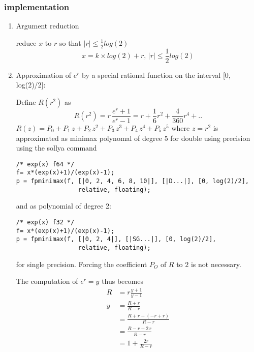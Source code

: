 \documentclass[12pt]{article}
\numberwithin{equation}{subsection}
\begin{document}
\subsubsection{implementation}
\begin{enumerate}
\item Argument reduction

      reduce $x$ to $r$ so that $ |r| \le \frac{1}{2} log(2) $
      \begin{equation}
        x = k \times log(2) + r, \, |r| \le \frac{1}{2} log(2)
      \end{equation}

\item Approximation of $e^r$ by a special rational function on the interval
    [0,\,log(2)/2]:

    Define $ R(r^2) $ as
    \begin{equation}
        R(r^2) = r \, \frac{e^r+1}{e^r-1}
               = r + \frac{1}{6}r^2 + \frac{4}{360}r^4 + ..
    \end{equation}
    $ R(z) = P_0 + P_1\, z + P_2\,z^2 + P_3\,z^3 + P_4\,z^4+ P_5\, z^5$
    where $z = r^2$ is approximated as minimax polynomal of degree 5 for double
    using precision using the sollya command

    \begin{verbatim}
/* exp(x) f64 */
f= x*(exp(x)+1)/(exp(x)-1);
p = fpminimax(f, [|0, 2, 4, 6, 8, 10|], [|D...|], [0, log(2)/2],
                 relative, floating);
    \end{verbatim}
    and as polynomial of degree 2:
    \begin{verbatim}
/* exp(x) f32 */
f= x*(exp(x)+1)/(exp(x)-1);
p = fpminimax(f, [|0, 2, 4|], [|SG...|], [0, log(2)/2],
                 relative, floating);
    \end{verbatim}
    for single precision.
    Forcing the coefficient $P_O$ of $R$ to $2$ is not necessary.

    The computation of $e^r=y$ thus becomes
    \[
        \begin{aligned}
            R &= r \frac{y+1}{y-1} \\
            y &= \frac{R+r}{R-r} \\
              &= \frac{R+r+(-r+r)}{R-r} \\
              &= \frac{R-r+2\,r}{R-r}\\
              &= 1 + \frac{2 r}{R-r}
        \end{aligned}
    \]


\end{enumerate}
\end{document}
